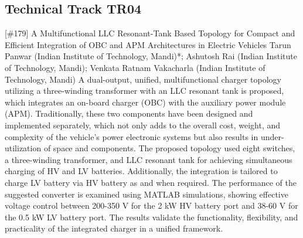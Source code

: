 \clearpage \subsection{Technical Track TR04}\nopagebreak {} \begin{abstract_online} {[\#179] A Multifunctional LLC Resonant-Tank Based Topology for Compact and Efficient Integration of OBC and APM Architectures in Electric Vehicles} {} {Tarun Panwar (Indian Institute of Technology, Mandi)*; Ashutosh Rai (Indian Institute of Technology, Mandi); Venkata Ratnam Vakacharla (Indian Institute of Technology, Mandi)} {} A dual-output, unified, multifunctional charger topology utilizing a three-winding transformer with an LLC resonant tank is proposed, which integrates an on-board charger (OBC) with the auxiliary power module (APM). Traditionally, these two components have been designed and implemented separately, which not only adds to the overall cost, weight, and complexity of the vehicle's power electronic systems but also results in under-utilization of space and components. The proposed topology used eight switches, a three-winding transformer, and LLC resonant tank for achieving simultaneous charging of HV and LV batteries. Additionally, the integration is tailored to charge LV battery via HV battery as and when required. The performance of the suggested converter is examined using MATLAB simulations, showing effective voltage control between 200-350 V for the 2 kW HV battery port and 38-60 V for the 0.5 kW LV battery port. The results validate the functionality, flexibility, and practicality of the integrated charger in a unified framework. \end{abstract_online} 
